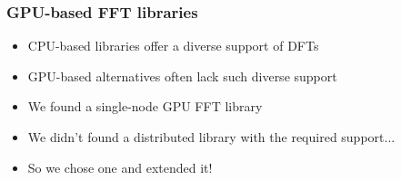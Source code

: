 \documentclass{beamer}
\begin{document}
\begin{frame}[noframenumbering]
    \frametitle{GPU-based FFT libraries}
    \begin{itemize}
        \item CPU-based libraries offer a diverse support of DFTs\pause
        \item GPU-based alternatives often lack such diverse support\pause
        \item We found a single-node GPU FFT library\pause
        \item We didn't found a distributed library with the required support...\pause
        \item So we chose one and extended it!
    \end{itemize}
\end{frame}
\end{document}
